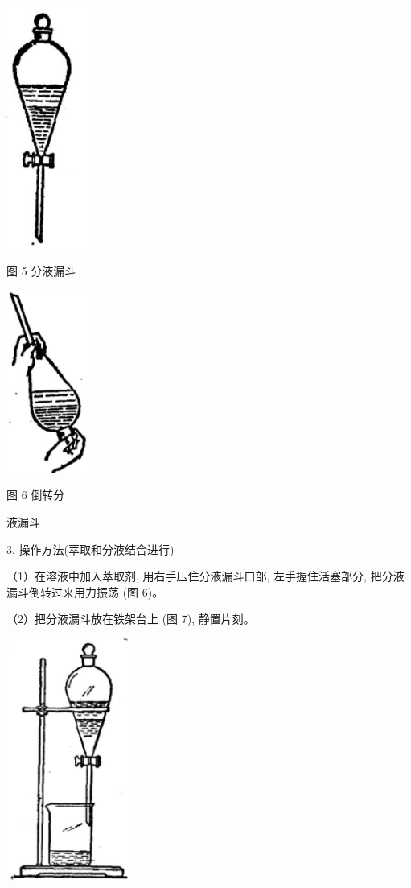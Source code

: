 \documentclass[10pt]{article}
\begin{document}
\begin{center}
\includegraphics[max width=0.2\textwidth]{images/01912d0f-097c-7e75-8f32-4f326cd86c9f_154_320195.jpg}
\end{center}

图 5 分液漏斗

\begin{center}
\includegraphics[max width=0.2\textwidth]{images/01912d0f-097c-7e75-8f32-4f326cd86c9f_154_430111.jpg}
\end{center}

图 6 倒转分

液漏斗

3. 操作方法(萃取和分液结合进行)

（1）在溶液中加入萃取剂, 用右手压住分液漏斗口部, 左手握住活塞部分, 把分液漏斗倒转过来用力振荡 (图 6)。

（2）把分液漏斗放在铁架台上 (图 7), 静置片刻。

\begin{center}
\includegraphics[max width=0.3\textwidth]{images/01912d0f-097c-7e75-8f32-4f326cd86c9f_155_240165.jpg}
\end{center}
\end{document}
